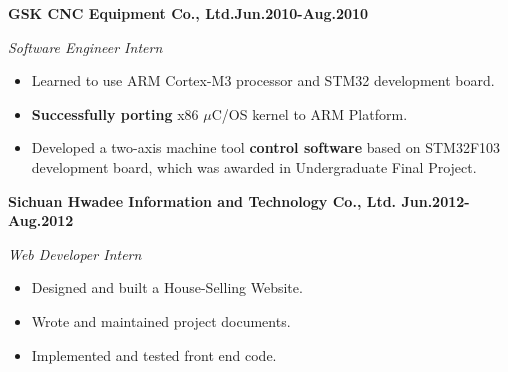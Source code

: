 \documentclass{myres}
\begin{document}
{
	\textbf{GSK CNC Equipment Co., Ltd.\hfill Jun.2010-Aug.2010}
	\par
	{\it Software Engineer Intern}
  \begin{itemize}[topsep=0pt, leftmargin=0.2in] \itemsep -5pt
			\item Learned to use ARM Cortex-M3 processor and STM32 development board.
			\item \textbf{Successfully porting} x86 $\mu$C/OS kernel to ARM Platform.
			\item Developed a two-axis machine tool \textbf{control software} based on
				STM32F103 development board, which was awarded in
				Undergraduate Final Project.
	\end{itemize}
	\par
	\smallskip
	\textbf{Sichuan Hwadee Information and Technology Co., Ltd. \hfill Jun.2012-Aug.2012}
	\par
	{\it Web Developer Intern}
  \begin{itemize}[topsep=0pt, leftmargin=0.2in] \itemsep -5pt
		\item Designed and built a House-Selling Website.
		\item Wrote and maintained project documents.
	  \item Implemented and tested front end code.
	\end{itemize}
	\par
}
\end{document}
